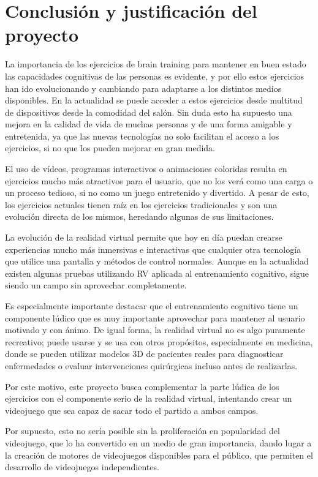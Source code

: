 \section{Conclusión y justificación del proyecto}


La importancia de los ejercicios de brain training para mantener en buen estado las capacidades cognitivas de las personas es evidente, y por ello estos ejercicios han ido evolucionando y cambiando para adaptarse a los distintos medios disponibles. En la actualidad se puede acceder a estos ejercicios desde multitud de dispositivos desde la comodidad del salón. Sin duda esto ha supuesto una mejora en la calidad de vida de muchas personas y de una forma amigable y entretenida, ya que las nuevas tecnologías no solo facilitan el acceso a los ejercicios, si no que los pueden mejorar en gran medida. 

El uso de vídeos, programas interactivos o animaciones coloridas resulta en ejercicios mucho más atractivos para el usuario, que no los verá como una carga o un proceso tedioso, si no como un juego entretenido y divertido. A pesar de esto, los ejercicios actuales tienen raíz en los ejercicios tradicionales y son una evolución directa de los mismos, heredando algunas de sus limitaciones. 

La evolución de la realidad virtual permite que hoy en día puedan crearse experiencias mucho más inmersivas e interactivas que cualquier otra tecnología que utilice una pantalla y métodos de control normales. Aunque en la actualidad existen algunas pruebas utilizando RV aplicada al entrenamiento cognitivo, sigue siendo un campo sin aprovechar completamente.

Es especialmente importante destacar que el entrenamiento cognitivo tiene un componente lúdico que es muy importante aprovechar para mantener al usuario motivado y con ánimo. De igual forma, la realidad virtual no es algo puramente recreativo; puede usarse y se usa con otros propósitos, especialmente en medicina, donde se pueden utilizar modelos 3D de pacientes reales para diagnosticar enfermedades o evaluar intervenciones quirúrgicas incluso antes de realizarlas.

Por este motivo, este proyecto busca complementar la parte lúdica de los ejercicios con el componente serio de la realidad virtual, intentando crear un videojuego que sea capaz de sacar todo el partido a ambos campos.

Por supuesto, esto no sería posible sin la proliferación en popularidad del videojuego, que lo ha convertido en un medio de gran importancia, dando lugar a la creación de motores de videojuegos disponibles para el público, que permiten el desarrollo de videojuegos independientes.



\chapterend
